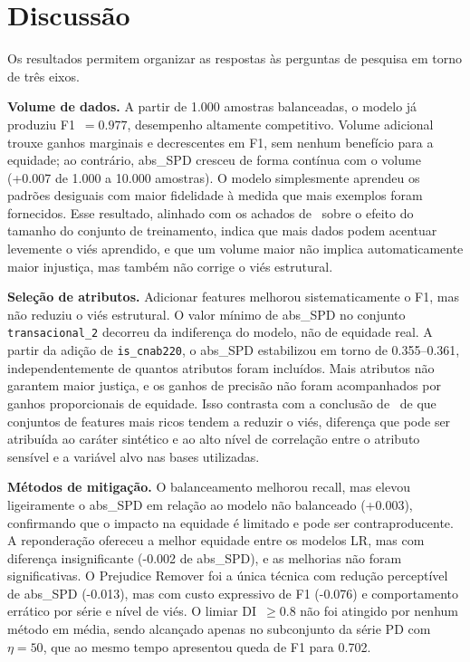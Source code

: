 \section{Discussão}
\label{sec:analises}

Os resultados permitem organizar as respostas às perguntas de pesquisa em torno de três eixos.

\textbf{Volume de dados.} A partir de 1.000 amostras balanceadas, o modelo já produziu F1~$= 0.977$, desempenho altamente competitivo. Volume adicional trouxe ganhos marginais e decrescentes em F1, sem nenhum benefício para a equidade; ao contrário, abs\_SPD cresceu de forma contínua com o volume (+0.007 de 1.000 a 10.000 amostras). O modelo simplesmente aprendeu os padrões desiguais com maior fidelidade à medida que mais exemplos foram fornecidos. Esse resultado, alinhado com os achados de~ sobre o efeito do tamanho do conjunto de treinamento, indica que mais dados podem acentuar levemente o viés aprendido, e que um volume maior não implica automaticamente maior injustiça, mas também não corrige o viés estrutural.

\textbf{Seleção de atributos.} Adicionar features melhorou sistematicamente o F1, mas não reduziu o viés estrutural. O valor mínimo de abs\_SPD no conjunto \texttt{transacional\_2} decorreu da indiferença do modelo, não de equidade real. A partir da adição de \texttt{is\_cnab220}, o abs\_SPD estabilizou em torno de 0.355--0.361, independentemente de quantos atributos foram incluídos. Mais atributos não garantem maior justiça, e os ganhos de precisão não foram acompanhados por ganhos proporcionais de equidade. Isso contrasta com a conclusão de~ de que conjuntos de features mais ricos tendem a reduzir o viés, diferença que pode ser atribuída ao caráter sintético e ao alto nível de correlação entre o atributo sensível e a variável alvo nas bases utilizadas.

\textbf{Métodos de mitigação.} O balanceamento melhorou recall, mas elevou ligeiramente o abs\_SPD em relação ao modelo não balanceado (+0.003), confirmando que o impacto na equidade é limitado e pode ser contraproducente. A reponderação ofereceu a melhor equidade entre os modelos LR, mas com diferença insignificante (-0.002 de abs\_SPD), e as melhorias não foram significativas. O Prejudice Remover foi a única técnica com redução perceptível de abs\_SPD (-0.013), mas com custo expressivo de F1 (-0.076) e comportamento errático por série e nível de viés. O limiar DI~$\geq 0.8$ não foi atingido por nenhum método em média, sendo alcançado apenas no subconjunto da série PD com $\eta = 50$, que ao mesmo tempo apresentou queda de F1 para 0.702.

